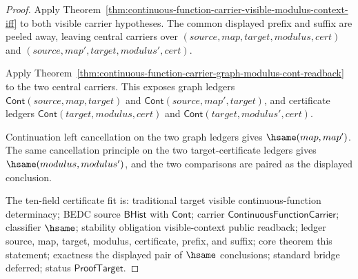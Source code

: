 \begin{proof}
Apply Theorem~\ref{thm:continuous-function-carrier-visible-modulus-context-iff}
to both visible carrier hypotheses. The common displayed prefix and suffix are
peeled away, leaving central carriers over
$(source,map,target,modulus,cert)$ and
$(source,map',target,modulus',cert)$.

Apply
Theorem~\ref{thm:continuous-function-carrier-graph-modulus-cont-readback} to
the two central carriers. This exposes graph ledgers
$\mathsf{Cont}(source,map,target)$ and
$\mathsf{Cont}(source,map',target)$, and certificate ledgers
$\mathsf{Cont}(target,modulus,cert)$ and
$\mathsf{Cont}(target,modulus',cert)$.

Continuation left cancellation on the two graph ledgers gives
$\hsame(map,map')$. The same cancellation principle on the two
target-certificate ledgers gives $\hsame(modulus,modulus')$, and the two
comparisons are paired as the displayed conclusion.

The ten-field certificate fit is: traditional target visible
continuous-function determinacy; BEDC source $\mathsf{BHist}$ with
$\mathsf{Cont}$; carrier $\mathsf{ContinuousFunctionCarrier}$; classifier
$\hsame$; stability obligation visible-context public readback; ledger source,
map, target, modulus, certificate, prefix, and suffix; core theorem this
statement; exactness the displayed pair of $\hsame$ conclusions; standard
bridge deferred; status $\mathsf{ProofTarget}$.
\end{proof}

